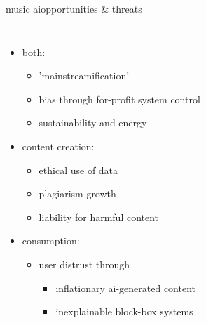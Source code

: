 \begin{frame}{music ai}{opportunities \& threats}
\begin{columns}
        \begin{itemize}
            \item both:
                \begin{itemize}
                    \item 'mainstreamification'
                    \item bias through for-profit system control
                    \item sustainability and energy 
                \end{itemize}
            \item content creation:
                \begin{itemize}
                    \item ethical use of data
                    \item plagiarism growth
                    \item liability for harmful content
                \end{itemize}
            \smallskip
            \item consumption:
                \begin{itemize}
                    \item user distrust through 
                        \begin{itemize}
                            \item inflationary ai-generated content
                            \item inexplainable block-box systems
                        \end{itemize}
                \end{itemize}
        \end{itemize}
    \end{columns}
\end{frame}




